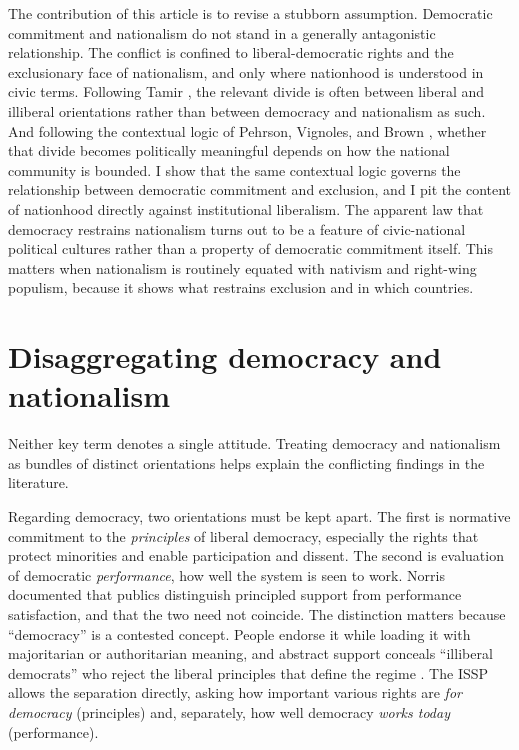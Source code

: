The contribution of this article is to revise a stubborn assumption. Democratic commitment and nationalism do not stand in a generally antagonistic relationship. The conflict is confined to liberal-democratic rights and the exclusionary face of nationalism, and only where nationhood is understood in civic terms. Following Tamir \citeyearpar{tamir2019}, the relevant divide is often between liberal and illiberal orientations rather than between democracy and nationalism as such. And following the contextual logic of Pehrson, Vignoles, and Brown \citeyearpar{pehrson2009}, whether that divide becomes politically meaningful depends on how the national community is bounded. I show that the same contextual logic governs the relationship between democratic commitment and exclusion, and I pit the content of nationhood directly against institutional liberalism. The apparent law that democracy restrains nationalism turns out to be a feature of civic-national political cultures rather than a property of democratic commitment itself. This matters when nationalism is routinely equated with nativism and right-wing populism, because it shows what restrains exclusion and in which countries.

\section{Disaggregating democracy and nationalism}\label{disaggregating-democracy-and-nationalism}

Neither key term denotes a single attitude. Treating democracy and nationalism as bundles of distinct orientations helps explain the conflicting findings in the literature.

Regarding democracy, two orientations must be kept apart. The first is normative commitment to the \emph{principles} of liberal democracy, especially the rights that protect minorities and enable participation and dissent. The second is evaluation of democratic \emph{performance}, how well the system is seen to work. Norris \citeyearpar{norris1999} documented that publics distinguish principled support from performance satisfaction, and that the two need not coincide. The distinction matters because ``democracy'' is a contested concept. People endorse it while loading it with majoritarian or authoritarian meaning, and abstract support conceals ``illiberal democrats'' who reject the liberal principles that define the regime \citep{kirsch2019, schedler2007}. The ISSP allows the separation directly, asking how important various rights are \emph{for democracy} (principles) and, separately, how well democracy \emph{works today} (performance).

